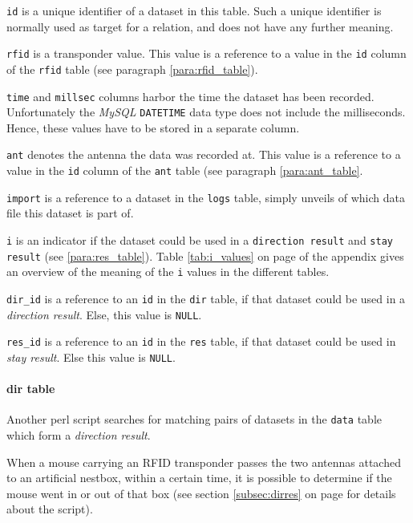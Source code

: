 \begin{mydesc}
  \item \lstinline|id| is a unique identifier of a dataset in this table. Such a unique identifier is normally used as target for a relation, and does not have any further meaning.
  \item \lstinline|rfid| is a transponder value. This value is a reference to a value in the \lstinline|id| column of the \lstinline|rfid| table (see paragraph \ref{para:rfid_table}).
  \item \lstinline|time| and \lstinline|millsec| columns harbor the time the dataset has been recorded. Unfortunately the \textit{MySQL} \lstinline|DATETIME| data type does not include the milliseconds. Hence, these values have to be stored in a separate column.
  \item \lstinline|ant| denotes the antenna the data was recorded at. This value is a reference to a value in the \lstinline|id| column of the \lstinline|ant| table (see paragraph \ref{para:ant_table}.
  \item \lstinline|import| is a reference to a dataset in the \lstinline|logs| table, simply unveils of which data file this dataset is part of.
  \item \lstinline|i| is an indicator if the dataset could be used in a \lstinline|direction result| and \lstinline|stay result| (see \ref{para:res_table}). Table \ref{tab:i_values} on page \pageref{tab:i_values} of the appendix gives an overview of the meaning of the \lstinline|i| values in the different tables.
  \item \lstinline|dir_id| is a reference to an \lstinline|id| in the \lstinline|dir| table, if that dataset could be used in a \textit{direction result}. Else, this value is \lstinline|NULL|.
  \item \lstinline|res_id| is a reference to an \lstinline|id| in the \lstinline|res| table, if that dataset could be used in \textit{stay result}. Else this value is \lstinline|NULL|.
\end{mydesc}

\paragraph{dir table}
\label{para:dir_table}
Another \ac{perl} script searches for matching pairs of datasets in the \lstinline|data| table which form a \textit{direction result}.

When a mouse carrying an \ac{RFID} transponder passes the two antennas attached to an artificial nestbox, within a certain time, it is possible to determine if the mouse went in or out of that box (see section \ref{subsec:dirres} on page \pageref{subsec:dirres} for details about the script). 


